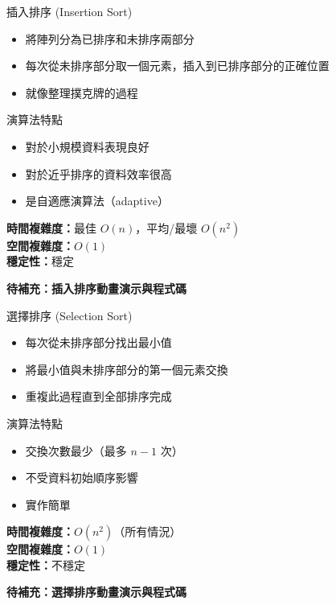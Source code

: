 \documentclass{beamer}
\begin{document}
\begin{frame}{插入排序 (Insertion Sort)}
\begin{itemize}
    \item 將陣列分為已排序和未排序兩部分
    \item 每次從未排序部分取一個元素，插入到已排序部分的正確位置
    \item 就像整理撲克牌的過程
\end{itemize}

\vspace{1em}
\begin{block}{演算法特點}
\begin{itemize}
    \item 對於小規模資料表現良好
    \item 對於近乎排序的資料效率很高
    \item 是自適應演算法（adaptive）
\end{itemize}
\end{block}

\vspace{1em}
\textbf{時間複雜度：}最佳 $O(n)$，平均/最壞 $O(n^2)$\\
\textbf{空間複雜度：}$O(1)$\\
\textbf{穩定性：}穩定

\vspace{1em}
\textbf{待補充：插入排序動畫演示與程式碼}
\end{frame}

\begin{frame}{選擇排序 (Selection Sort)}
\begin{itemize}
    \item 每次從未排序部分找出最小值
    \item 將最小值與未排序部分的第一個元素交換
    \item 重複此過程直到全部排序完成
\end{itemize}

\vspace{1em}
\begin{block}{演算法特點}
\begin{itemize}
    \item 交換次數最少（最多 $n-1$ 次）
    \item 不受資料初始順序影響
    \item 實作簡單
\end{itemize}
\end{block}

\vspace{1em}
\textbf{時間複雜度：}$O(n^2)$（所有情況）\\
\textbf{空間複雜度：}$O(1)$\\
\textbf{穩定性：}不穩定

\vspace{1em}
\textbf{待補充：選擇排序動畫演示與程式碼}
\end{frame}
\end{document}

